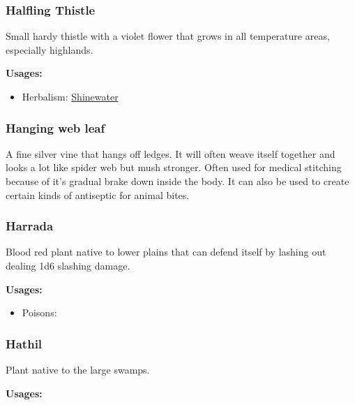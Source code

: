 \subsubsection{Halfling Thistle}
\label{Halfling Thistle}

Small hardy thistle with a violet flower that grows in all temperature areas, especially highlands.

\vspace{5mm}

\textbf{Usages:}

\begin{itemize}[noitemsep]
\item[] Herbalism: \hyperref[Shinewater]{Shinewater}
\end{itemize}

\subsubsection{Hanging web leaf}
\label{hanging_web_leaf}

A fine silver vine that hangs off ledges. It will often weave itself together and looks a lot like spider web but mush stronger. Often used for medical stitching because of it's gradual brake down inside the body. It can also be used to create certain kinds of antiseptic for animal bites.

\subsubsection{Harrada}
\label{Harrada}

Blood red plant native to lower plains that can defend itself by lashing out dealing 1d6 slashing damage.

\vspace{5mm}

\textbf{Usages:}

\begin{itemize}[noitemsep]
\item[] Poisons: \poison
\end{itemize}

\subsubsection{Hathil}
\label{Hathil}

Plant native to the large swamps.

\vspace{5mm}

\textbf{Usages:}

